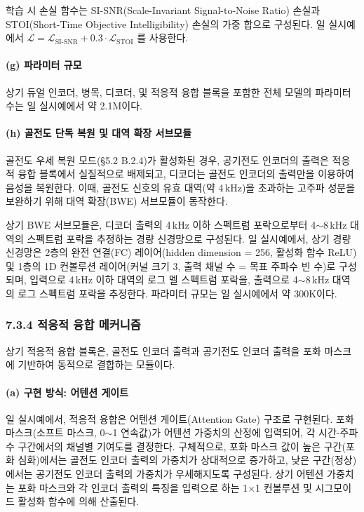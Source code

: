 \documentclass{article}
\begin{document}
학습 시 손실 함수는 SI-SNR(Scale-Invariant Signal-to-Noise Ratio) 손실과 STOI(Short-Time Objective Intelligibility) 손실의 가중 합으로 구성된다. 일 실시예에서 $\mathcal{L} = \mathcal{L}_{\text{SI-SNR}} + 0.3 \cdot \mathcal{L}_{\text{STOI}}$ 를 사용한다.

\paragraph{(g) 파라미터 규모}

상기 듀얼 인코더, 병목, 디코더, 및 적응적 융합 블록을 포함한 전체 모델의 파라미터 수는 일 실시예에서 약 2.1M이다.

\paragraph{(h) 골전도 단독 복원 및 대역 확장 서브모듈}

골전도 우세 복원 모드(§5.2 B.2.4)가 활성화된 경우, 공기전도 인코더의 출력은 적응적 융합 블록에서 실질적으로 배제되고, 디코더는 골전도 인코더의 출력만을 이용하여 음성을 복원한다. 이때, 골전도 신호의 유효 대역(약 4\,kHz)을 초과하는 고주파 성분을 보완하기 위해 대역 확장(BWE) 서브모듈이 동작한다.

상기 BWE 서브모듈은, 디코더 출력의 4\,kHz 이하 스펙트럼 포락으로부터 4$\sim$8\,kHz 대역의 스펙트럼 포락을 추정하는 경량 신경망으로 구성된다. 일 실시예에서, 상기 경량 신경망은 2층의 완전 연결(FC) 레이어(hidden dimension = 256, 활성화 함수 ReLU) 및 1층의 1D 컨볼루션 레이어(커널 크기 3, 출력 채널 수 = 목표 주파수 빈 수)로 구성되며, 입력으로 4\,kHz 이하 대역의 로그 멜 스펙트럼 포락을, 출력으로 4$\sim$8\,kHz 대역의 로그 스펙트럼 포락을 추정한다. 파라미터 규모는 일 실시예에서 약 300K이다.

\subsubsection{7.3.4 적응적 융합 메커니즘}

상기 적응적 융합 블록은, 골전도 인코더 출력과 공기전도 인코더 출력을 포화 마스크에 기반하여 동적으로 결합하는 모듈이다.

\paragraph{(a) 구현 방식: 어텐션 게이트}

일 실시예에서, 적응적 융합은 어텐션 게이트(Attention Gate) 구조로 구현된다. 포화 마스크(소프트 마스크, 0$\sim$1 연속값)가 어텐션 가중치의 산정에 입력되어, 각 시간-주파수 구간에서의 채널별 기여도를 결정한다. 구체적으로, 포화 마스크 값이 높은 구간(포화 심화)에서는 골전도 인코더 출력의 가중치가 상대적으로 증가하고, 낮은 구간(정상)에서는 공기전도 인코더 출력의 가중치가 우세해지도록 구성된다. 상기 어텐션 가중치는 포화 마스크와 각 인코더 출력의 특징을 입력으로 하는 1$\times$1 컨볼루션 및 시그모이드 활성화 함수에 의해 산출된다.
\end{document}
